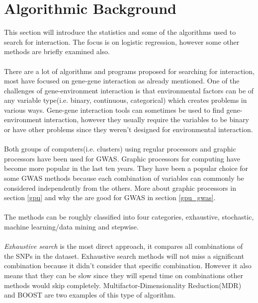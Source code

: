 \documentclass[10pt,a4paper]{report}
\newcounter{example}
\begin{document}
\section{Algorithmic Background}
This section will introduce the statistics and some of the algorithms used to search for interaction. The focus is on logistic regression, however some other methods are briefly examined also.\\
\\
There are a lot of algorithms and programs proposed for searching for interaction, most have focused on gene-gene interaction as already mentioned\cite{gene_enviroment_2013}. One of the challenges of gene-environment interaction is that environmental factors can be of any variable type(i.e. binary, continuous, categorical) which creates problems in various ways\cite{gene_enviroment_2013}. Gene-gene interaction tools can sometimes be used to find gene-environment interaction, however they usually require the variables to be binary or have other problems since they weren't designed for environmental interaction\cite{gene_enviroment_2013}.\\
\\
Both groups of computers(i.e. clusters) using regular processors\cite{biforce} and graphic processors\cite{gwis,gboost,gmdr_gpu,cuda_lr,genie_2012,plink_gpu} have been used for GWAS. Graphic processors for computing have become more popular in the last ten years. They have been a popular choice for some GWAS methods because each combination of variables can commonly be considered independently from the others. More about graphic processors in section \ref{gpu} and why the are good for GWAS in section \ref{gpu_gwas}.\\
\\
The methods can be roughly classified into four categories, exhaustive, stochastic, machine learning/data mining and stepwise\cite{fast_high_order_cluster}.\\
\\
\emph{Exhaustive search} is the most direct approach, it compares all combinations of the SNPs in the dataset. Exhaustive search methods will not miss a significant combination because it didn't consider that specific combination. However it also means that they can be slow since they will spend time on combinations other methods would skip completely. Multifactor-Dimensionality Reduction(MDR)\cite{mdr_2001} and BOOST\cite{boost_gene_gene} are two examples of this type of algorithm.\\
\\
\end{document}
